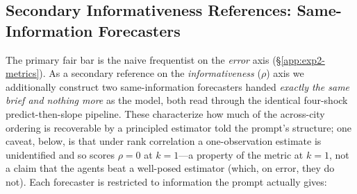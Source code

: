\subsection{Secondary Informativeness References: Same-Information Forecasters}
\label{app:exp2-parity-refs}

The primary fair bar is the naive frequentist on the \emph{error} axis (\S\ref{app:exp2-metrics}).
As a secondary reference on the \emph{informativeness} ($\rho$) axis we additionally construct two
same-information forecasters handed \emph{exactly the same brief and nothing more} as the model,
both read through the identical four-shock predict-then-slope pipeline.  These characterize how much
of the across-city ordering is recoverable by a principled estimator told the prompt's structure;
one caveat, below, is that under rank correlation a one-observation estimate is unidentified and so
scores $\rho{=}0$ at $k{=}1$---a property of the metric at $k{=}1$, not a claim that the agents beat
a well-posed estimator (which, on error, they do not).  Each forecaster is restricted to information
the prompt actually gives:

